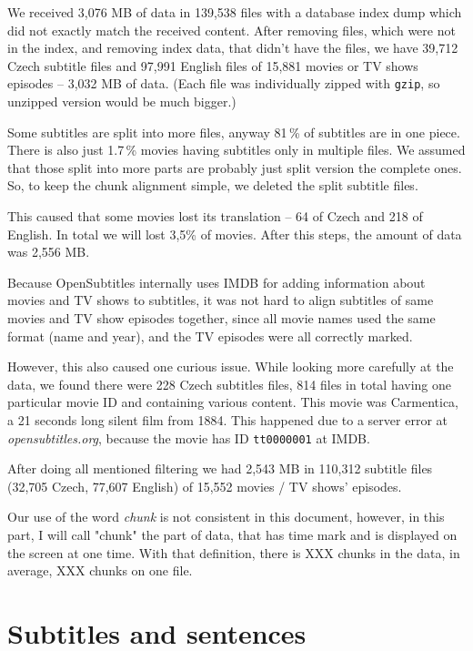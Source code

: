 We received 3,076 MB of data in 139,538 files with a database index dump which did not exactly match the received content. After removing files, which were not in the index, and removing index data, that didn't have the files, we have 39,712 Czech subtitle files and 97,991 English files of 15,881 movies or TV shows episodes -- 3,032 MB of data. (Each file was individually zipped with \texttt{gzip}, so unzipped version would be much bigger.)

Some subtitles are split into more files, anyway 81\,\% of subtitles are in one piece. There is also just 1.7\,\% movies having subtitles only in multiple files. We assumed that those split into more parts are probably just split version the complete ones. So, to keep the chunk alignment simple, we deleted the split subtitle files.

This caused that some movies lost its translation -- 64
of Czech and 218 of English. In total we will lost 3,5\% of movies. After this steps, the amount of data was 2,556 MB.

Because OpenSubtitles internally uses IMDB for adding information about movies and TV shows to subtitles, it was not hard to align subtitles of same movies and TV show episodes together, since all movie names used the same format (name and year), and the TV episodes were all correctly marked.

However, this also caused one curious issue. While looking more carefully at the data, we found there were 228 Czech subtitles files, 814 files in total having one particular movie ID and containing various content. This movie was Carmentica, a 21 seconds long silent film from 1884. This happened due to a server error at \emph{opensubtitles.org}, because the movie has ID {\tt tt0000001} at IMDB.

After doing all mentioned filtering we had 2,543 MB in 110,312 subtitle files (32,705 Czech, 77,607 English) of 15,552 movies / TV shows' episodes.

Our use of the word \emph{chunk} is not consistent in this document, however, in this part, I will call "chunk" the part of data, that has time mark and is displayed on the screen at one time. With that definition, there is XXX chunks in the data, in average, XXX chunks on one file.

\section{Subtitles and sentences}

